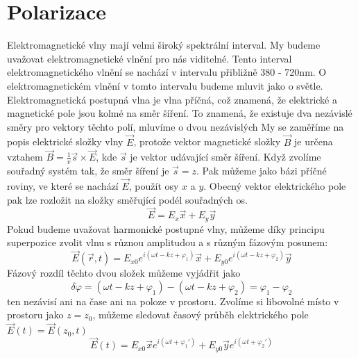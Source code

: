 \documentclass[a4paper]{article}
\numberwithin{equation}{section}
\begin{document}
	\section{Polarizace}
    Elektromagnetické vlny mají velmi široký spektrální interval. My budeme uvažovat elektromagnetické vlnění
    pro nás viditelné. Tento interval elektromagnetického vlnění se nachází v intervalu přibližně 380 - 720nm.
    O elektromagnetickém vlnění v tomto intervalu budeme mluvit jako o světle. %
    \\Elektromagnetická postupná vlna je vlna příčná, což znamená, že elektrické a magnetické pole jsou kolmé
    na směr šíření. To znamená, že existuje dva nezávislé směry pro vektory těchto polí, mluvíme o dvou
    nezávislých My se zaměříme na popis elektrické složky vlny $\vec{E}$, protože vektor magnetické složky
    $\vec{B}$ je určena vztahem $\vec{B}= \frac{1}{v}\vec{s}\times\vec{E}$, kde $\vec{s}$ je vektor udávající
    směr šíření. Když zvolíme souřadný systém tak, že směr šíření je $\vec{s}=z$. Pak můžeme jako bázi příčné
    roviny, ve které se nachází $\vec{E}$, použít osy $x$ a $y$. Obecný vektor elektrického pole pak lze
    rozložit na složky směřující podél souřadných os.
    \begin{equation} \label{eq:1}
        \vec{E} = E_x\vec{x} + E_y\vec{y}
    \end{equation}
    Pokud budeme uvažovat harmonické postupné vlny, můžeme díky principu superpozice zvolit vlnu s různou
    amplitudou a s různým fázovým posunem:
    \begin{equation} \label{eq:2}
        \vec{E}(\vec{r},t) = E_{x0} e^{i(\omega t - kz + \varphi_1)} \vec{x} + 
                             E_{y0} e^{i(\omega t - kz + \varphi_2)} \vec{y}
    \end{equation}
    Fázový rozdíl těchto dvou složek můžeme vyjádřit jako 
    \begin{equation} \label{eq:3}
        \delta \varphi = (\omega t -kz + \varphi_1) - (\omega t -kz + \varphi_2) = \varphi_1 - \varphi_2
    \end{equation}
    ten nezávisí ani na čase ani na poloze v prostoru. Zvolíme si libovolné místo v prostoru jako
    $z = z_0$, můžeme sledovat časový průběh elektrického pole $\vec{E}(t) = \vec{E}(z_0,t)$
    \begin{equation} \label{eq:4}
        \vec{E}(t) = E_{x0} \vec{x} e^{i(\omega t + \varphi_1')} + E_{y0} \vec{y} e^{i(\omega t + \varphi_2')}
    \end{equation}
\end{document}
